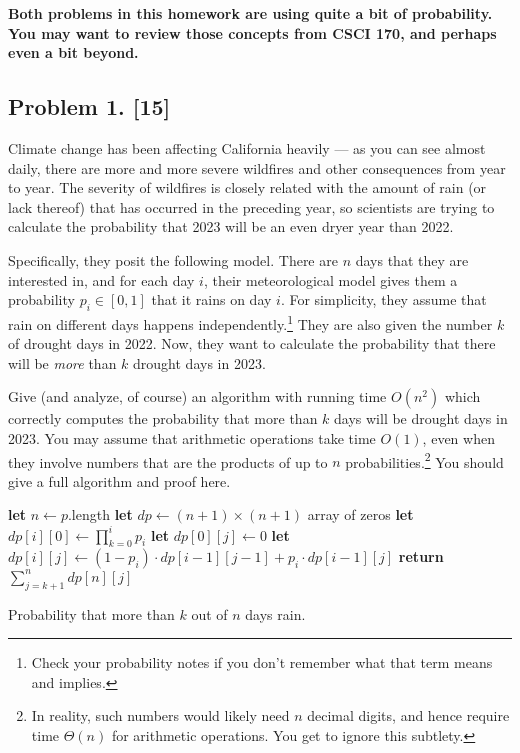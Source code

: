 \documentclass[10pt]{article}
\begin{document}
\newpage

\textbf{Both problems in this homework are using quite a bit of probability. You may want to review those concepts from CSCI 170, and perhaps even a bit beyond.}

\subsection*{Problem 1. [15]}
Climate change has been affecting California heavily --- as you can see almost daily, there are more and more severe wildfires and other consequences from year to year. The severity of wildfires is closely related with the amount of rain (or lack thereof) that has occurred in the preceding year, so scientists are trying to calculate the probability that 2023 will be an even dryer year than 2022.

Specifically, they posit the following model. There are $n$ days that they are interested in, and for each day $i$, their meteorological model gives them a probability $p_i \in [0,1]$ that it rains on day $i$. For simplicity, they assume that rain on different days happens independently.\footnote{Check your probability notes if you don't remember what that term means and implies.} They are also given the number $k$ of drought days in 2022. Now, they want to calculate the probability that there will be \emph{more} than $k$ drought days in 2023.

Give (and analyze, of course) an algorithm with running time $O(n^2)$ which correctly computes the probability that more than $k$ days will be drought days in 2023. You may assume that arithmetic operations take time $O(1)$, even when they involve numbers that are the products of up to $n$ probabilities.\footnote{In reality, such numbers would likely need $n$ decimal digits, and hence require time $\Theta(n)$ for arithmetic operations. You get to ignore this subtlety.}
You should give a full algorithm and proof here.


\begin{algorithm}[htb]
  \begin{algorithmic}
    \STATE \textbf{let} \(n \gets p\).length
    \STATE \textbf{let} \(dp \gets (n + 1) \times (n + 1)\) array of zeros
      \STATE \textbf{let} \(dp[i][0] \gets \prod_{k = 0}^i p_i\)
    \ENDFOR
      \STATE \textbf{let} \(dp[0][j] \gets 0\)
    \ENDFOR
        \STATE \textbf{let} \(dp[i][j] \gets (1 - p_i) \cdot dp[i - 1][j - 1] + p_i \cdot dp[i - 1][j]\)
      \ENDFOR
    \ENDFOR
    \STATE \textbf{return} \(\sum_{j = k + 1}^n dp[n][j]\)
  \end{algorithmic}
  \caption{Probability that more than \(k\) out of \(n\) days rain. \label{alg:rain-days}}
\end{algorithm}
\end{document}
